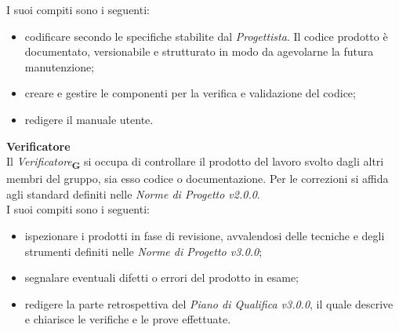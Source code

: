 I suoi compiti sono i seguenti:
\begin{itemize}
    \item codificare secondo le specifiche stabilite dal \textit{Progettista}. Il codice prodotto è documentato, versionabile e strutturato in modo da agevolarne la futura manutenzione;
    \item creare e gestire le componenti per la verifica e validazione del codice;
    \item redigere il manuale utente.
\end{itemize}
\textbf{Verificatore}\\
Il \textit{Verificatore}\textsubscript{\textbf{G}} si occupa di controllare il prodotto del lavoro svolto dagli altri membri del gruppo, sia esso codice o documentazione. Per le correzioni si affida agli standard definiti nelle \textit{Norme di Progetto v2.0.0}.\\
I suoi compiti sono i seguenti:
\begin{itemize}
    \item ispezionare i prodotti in fase di revisione, avvalendosi delle tecniche e degli strumenti definiti nelle \textit{Norme di Progetto v3.0.0};
    \item segnalare eventuali difetti o errori del prodotto in esame;
    \item redigere la parte retrospettiva del \textit{Piano di Qualifica v3.0.0}, il quale descrive e chiarisce le verifiche e le prove effettuate.
\end{itemize}

